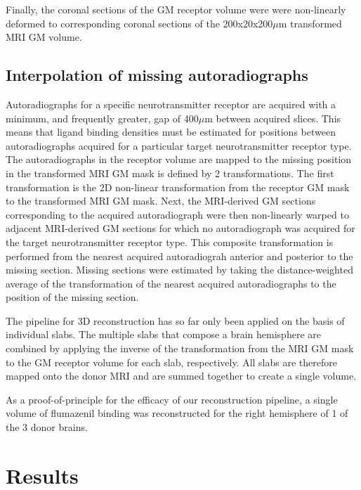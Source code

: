 \documentclass[12pt]{article}
\begin{document}
    Finally, the coronal sections of the GM receptor volume were were non-linearly deformed to corresponding coronal sections of the 200x20x200$\mu$m transformed MRI GM volume.
    
\subsection{Interpolation of missing autoradiographs}

Autoradiographs for a specific neurotransmitter receptor are acquired with a minimum, and frequently greater, gap of 400$\mu$m between acquired slices. This means that ligand binding densities must be estimated for positions between autoradiographs acquired for a particular target neurotransmitter receptor type. The autoradiographs in the receptor volume are mapped to the missing position in the transformed MRI GM mask is defined by 2 transformations. The first transformation is the 2D non-linear transformation from the receptor GM mask to the transformed MRI GM mask. Next, the MRI-derived GM sections corresponding to the acquired autoradiograph were then non-linearly warped to adjacent MRI-derived GM sections for which no autoradiograph was acquired for the target neurotransmitter receptor type. This composite transformation is performed from the nearest acquired autoradiograh anterior and posterior to the missing section. Missing sections were estimated by taking the distance-weighted average of the transformation of the nearest acquired autoradiographs to the position of the missing section. 

The pipeline for 3D reconstruction has so far only been applied on the basis of individual slabs. The multiple slabs that compose a brain hemisphere are combined by applying the inverse of the transformation from the MRI GM mask to the GM receptor volume for each slab, respectively. All slabs are therefore mapped onto the donor MRI and are summed together to create a single volume. 

As a proof-of-principle for the efficacy of our reconstruction pipeline, a single volume of flumazenil binding was reconstructed for the right hemisphere of 1 of the 3 donor brains. 

\section{Results}



\Discussion{}




\end{document}
